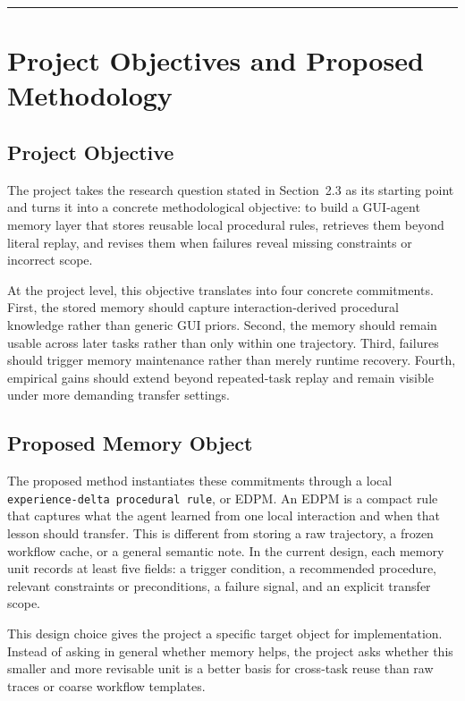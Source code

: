 \documentclass{article}
\begin{document}
\begin{center}\rule{0.5\linewidth}{0.5pt}\end{center}

\section{Project Objectives and Proposed
Methodology}\label{8-project-objectives-and-proposed-methodology}

\subsection{Project Objective}\label{81-project-objective}

The project takes the research question stated in Section~2.3 as its
starting point and turns it into a concrete methodological objective: to
build a GUI-agent memory layer that stores reusable local procedural
rules, retrieves them beyond literal replay, and revises them when
failures reveal missing constraints or incorrect scope.

At the project level, this objective translates into four concrete
commitments. First, the stored memory should capture interaction-derived
procedural knowledge rather than generic GUI priors. Second, the memory
should remain usable across later tasks rather than only within one
trajectory. Third, failures should trigger memory maintenance rather
than merely runtime recovery. Fourth, empirical gains should extend
beyond repeated-task replay and remain visible under more demanding
transfer settings.

\subsection{Proposed Memory Object}\label{82-proposed-memory-object}

The proposed method instantiates these commitments through a local
\texttt{experience-delta\ procedural\ rule}, or EDPM. An EDPM is a
compact rule that captures what the agent learned from one local
interaction and when that lesson should transfer. This is different from
storing a raw trajectory, a frozen workflow cache, or a general semantic
note. In the current design, each memory unit records at least five
fields: a trigger condition, a recommended procedure, relevant
constraints or preconditions, a failure signal, and an explicit transfer
scope.

This design choice gives the project a specific target object for
implementation. Instead of asking in general whether memory helps, the
project asks whether this smaller and more revisable unit is a better
basis for cross-task reuse than raw traces or coarse workflow templates.
\end{document}
